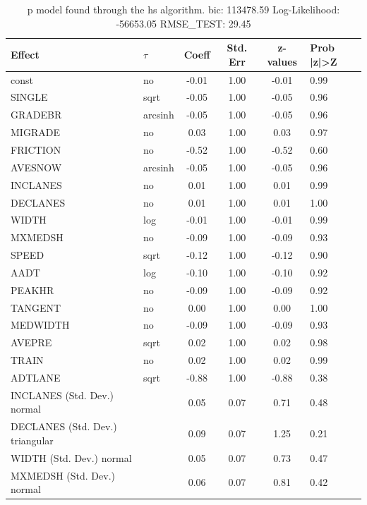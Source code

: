 \begin{table}
	\caption{p model found through the hs algorithm. bic: 113478.59 Log-Likelihood: -56653.05 RMSE_TEST: 29.45}
	\begin{center}
		\begin{tabular}{|l|l|c|c|c|l|}
			\hline
			Effect & $\tau$ & Coeff & Std. Err & z-values & Prob |z|>Z \\
			\hline
			const & no & -0.01 & 1.00 & -0.01 & 0.99 \\
			\hline
			SINGLE & sqrt & -0.05 & 1.00 & -0.05 & 0.96 \\
			\hline
			GRADEBR & arcsinh & -0.05 & 1.00 & -0.05 & 0.96 \\
			\hline
			MIGRADE & no & 0.03 & 1.00 & 0.03 & 0.97 \\
			\hline
			FRICTION & no & -0.52 & 1.00 & -0.52 & 0.60 \\
			\hline
			AVESNOW & arcsinh & -0.05 & 1.00 & -0.05 & 0.96 \\
			\hline
			INCLANES & no & 0.01 & 1.00 & 0.01 & 0.99 \\
			\hline
			DECLANES & no & 0.01 & 1.00 & 0.01 & 1.00 \\
			\hline
			WIDTH & log & -0.01 & 1.00 & -0.01 & 0.99 \\
			\hline
			MXMEDSH & no & -0.09 & 1.00 & -0.09 & 0.93 \\
			\hline
			SPEED & sqrt & -0.12 & 1.00 & -0.12 & 0.90 \\
			\hline
			AADT & log & -0.10 & 1.00 & -0.10 & 0.92 \\
			\hline
			PEAKHR & no & -0.09 & 1.00 & -0.09 & 0.92 \\
			\hline
			TANGENT & no & 0.00 & 1.00 & 0.00 & 1.00 \\
			\hline
			MEDWIDTH & no & -0.09 & 1.00 & -0.09 & 0.93 \\
			\hline
			AVEPRE & sqrt & 0.02 & 1.00 & 0.02 & 0.98 \\
			\hline
			TRAIN & no & 0.02 & 1.00 & 0.02 & 0.99 \\
			\hline
			ADTLANE & sqrt & -0.88 & 1.00 & -0.88 & 0.38 \\
			\hline
			INCLANES (Std. Dev.) normal &  & 0.05 & 0.07 & 0.71 & 0.48 \\
			\hline
			DECLANES (Std. Dev.) triangular &  & 0.09 & 0.07 & 1.25 & 0.21 \\
			\hline
			WIDTH (Std. Dev.) normal &  & 0.05 & 0.07 & 0.73 & 0.47 \\
			\hline
			MXMEDSH (Std. Dev.) normal &  & 0.06 & 0.07 & 0.81 & 0.42 \\

\end{tabular}
\end{center}
\end{table}
